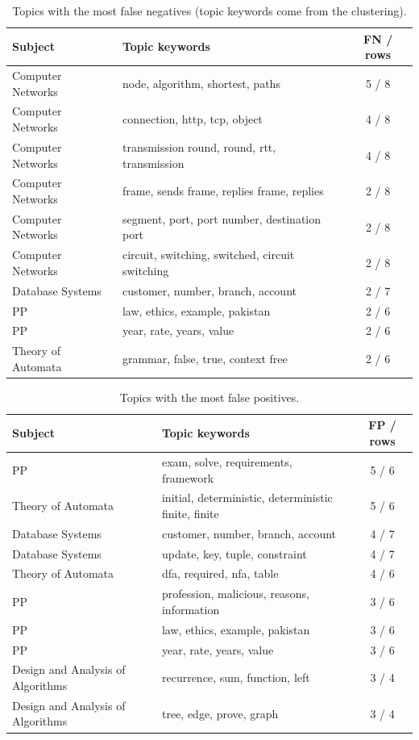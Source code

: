 \documentclass[11pt,a4paper]{article}
\begin{document}
\begin{table}[!htb]
\centering
\small
\begin{tabular}{p{3.3cm}p{6.6cm}c}
\toprule
Subject & Topic keywords & FN / rows \\
\midrule
Computer Networks & node, algorithm, shortest, paths & 5 / 8 \\
Computer Networks & connection, http, tcp, object & 4 / 8 \\
Computer Networks & transmission round, round, rtt, transmission & 4 / 8 \\
Computer Networks & frame, sends frame, replies frame, replies & 2 / 8 \\
Computer Networks & segment, port, port number, destination port & 2 / 8 \\
Computer Networks & circuit, switching, switched, circuit switching & 2 / 8 \\
Database Systems & customer, number, branch, account & 2 / 7 \\
PP & law, ethics, example, pakistan & 2 / 6 \\
PP & year, rate, years, value & 2 / 6 \\
Theory of Automata & grammar, false, true, context free & 2 / 6 \\
\bottomrule
\end{tabular}
\caption{Topics with the most false negatives (topic keywords come from the clustering).}
\label{tab:fn}
\end{table}

\begin{table}[!htb]
\centering
\small
\begin{tabular}{p{3.3cm}p{6.6cm}c}
\toprule
Subject & Topic keywords & FP / rows \\
\midrule
PP & exam, solve, requirements, framework & 5 / 6 \\
Theory of Automata & initial, deterministic, deterministic finite, finite & 5 / 6 \\
Database Systems & customer, number, branch, account & 4 / 7 \\
Database Systems & update, key, tuple, constraint & 4 / 7 \\
Theory of Automata & dfa, required, nfa, table & 4 / 6 \\
PP & profession, malicious, reasons, information & 3 / 6 \\
PP & law, ethics, example, pakistan & 3 / 6 \\
PP & year, rate, years, value & 3 / 6 \\
Design and Analysis of Algorithms & recurrence, sum, function, left & 3 / 4 \\
Design and Analysis of Algorithms & tree, edge, prove, graph & 3 / 4 \\
\bottomrule
\end{tabular}
\caption{Topics with the most false positives.}
\label{tab:fp}
\end{table}
\end{document}
